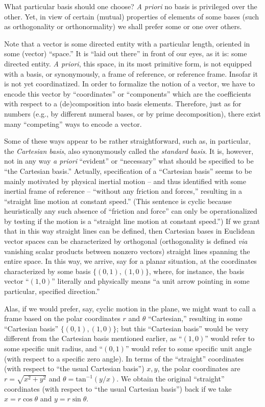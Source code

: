 What particular basis should one choose?
{\em A priori} no basis is privileged over the other.
Yet, in view of certain (mutual) properties of elements of some bases (such as orthogonality or orthonormality)
we shall prefer some or one over others.


Note that a vector is some directed entity with a particular length,
oriented in some (vector) ``space.''
It is ``laid out there'' in front of our eyes, as it is: some directed entity.
{\it A priori}, this space, in its most primitive form,
is not equipped with a basis, or synonymously, a frame of reference, or reference frame.
Insofar it is not yet coordinatized.
In order to formalize the notion of a vector, we have to encode this vector by ``coordinates''
or ``components'' which are the coefficients with respect to a (de)composition into basis elements.
Therefore, just as for numbers (e.g., by different numeral bases, or by prime decomposition),
there exist many ``competing'' ways to encode a vector.

Some of these ways appear to be rather straightforward,
such as, in particular, the {\em Cartesian basis},
also synonymously called the  {\em standard basis}.
It is, however, not in any way {\it a priori}
``evident'' or ``necessary'' what should be specified to be ``the Cartesian basis.''
Actually, specification of a ``Cartesian basis'' seems to be mainly motivated by
physical inertial motion --
and thus identified with some inertial frame of reference --
``without any friction and
forces,'' resulting in a ``straight line motion at constant speed.''
(This sentence is  cyclic because heuristically any such absence of ``friction and
force''  can only be operationalized by testing if the motion is a
``straight line motion at constant speed.'')
If we grant that in this way straight lines can be defined, then
Cartesian bases in Euclidean vector spaces can be characterized by
orthogonal (orthogonality is defined {\it via} vanishing scalar products between nonzero vectors)
straight lines spanning the entire space.
In this way, we arrive, say for a planar situation, at the coordinates
characterized by some basis $\{(0,1),(1,0)\}$,
where, for instance, the basis vector ``$(1,0)$'' literally and physically
means ``a unit arrow pointing in some particular, specified direction.''

Alas, if we would prefer, say, cyclic motion in the plane,
we might want to call a frame based on the polar coordinates $r$ and $\theta$ ``Cartesian,''
resulting in some ``Cartesian basis'' $\{(0,1),(1,0)\}$;
but this ``Cartesian basis'' would be very different from the Cartesian
basis mentioned earlier,
as ``$(1,0)$'' would refer to some specific unit radius,
and ``$(0,1)$'' would refer to some specific unit angle (with respect to a specific zero angle).
In terms of the ``straight'' coordinates (with respect to ``the usual Cartesian basis'')
$x,y$, the polar coordinates are $r = \sqrt{x^2+y^2}$ and $\theta = \mathrm{tan}^{-1} (y/x)$.
We obtain the original ``straight'' coordinates (with respect to ``the usual Cartesian basis'')
back if we take
$x=r\cos \theta$
and
$y=r\sin \theta$.

